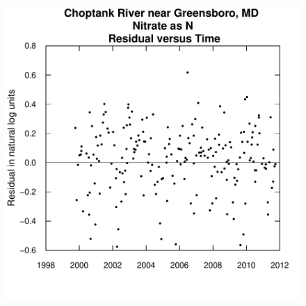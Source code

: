 \documentclass[a4paper,11pt]{article}
\begin{document}
\begin{figure}[htbp]
\begin{minipage}[h]{0.5\linewidth}
\begin{center}
\includegraphics{EGRET-figplotResidTime}
    \label{fig:plotResidTime}
    \end{center}
  \end{minipage}
  \caption{}
  \label{fig:plotResidQANDplotResidTime}
\end{figure}
\end{document}
